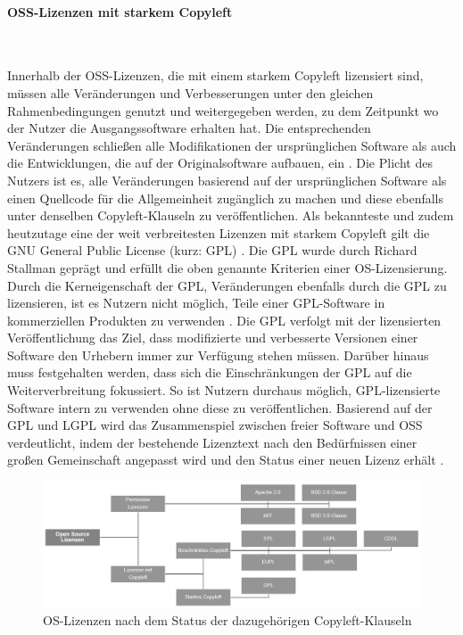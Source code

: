 \paragraph{OSS-Lizenzen mit starkem Copyleft}$~$

Innerhalb der OSS-Lizenzen, die mit einem starkem Copyleft lizensiert sind, müssen alle Veränderungen und Verbesserungen unter den gleichen Rahmenbedingungen genutzt und weitergegeben werden, zu dem Zeitpunkt wo der Nutzer die Ausgangssoftware erhalten hat. Die entsprechenden Veränderungen schließen alle Modifikationen der ursprünglichen Software als auch die Entwicklungen, die auf der Originalsoftware aufbauen, ein \cite[S. 20]{renner_open_2006}. Die Plicht des Nutzers ist es, alle Veränderungen basierend auf der ursprünglichen Software als einen Quellcode für die Allgemeinheit zugänglich zu machen und diese ebenfalls unter denselben Copyleft-Klauseln zu veröffentlichen. Als bekannteste und zudem heutzutage eine der weit verbreitesten Lizenzen mit starkem Copyleft gilt die GNU General Public License (kurz: GPL) \cite{fsf_gnu_2021}. Die GPL wurde durch Richard Stallman geprägt und erfüllt die oben genannte Kriterien einer OS-Lizensierung. Durch die Kerneigenschaft der GPL, Veränderungen ebenfalls durch die GPL zu lizensieren, ist es Nutzern nicht möglich, Teile einer GPL-Software in kommerziellen Produkten zu verwenden \cite[S. 10/11]{bitkom_open_nodate}. Die GPL verfolgt mit der lizensierten Veröffentlichung das Ziel, dass modifizierte und verbesserte Versionen einer Software den Urhebern immer zur Verfügung stehen müssen. Darüber hinaus muss festgehalten werden, dass sich die Einschränkungen der GPL auf die Weiterverbreitung fokussiert. So ist Nutzern durchaus möglich, GPL-lizensierte Software intern zu verwenden ohne diese zu veröffentlichen. Basierend auf der GPL und LGPL wird das Zusammenspiel zwischen freier Software und OSS verdeutlicht, indem der bestehende Lizenztext nach den Bedürfnissen einer großen Gemeinschaft angepasst wird und den Status einer neuen Lizenz erhält \cite[S. 35/36]{schaaf_open-source-lizenzen_2013}.

\begin{figure}[h]
    \centering
    \includegraphics[scale=0.55]{Bilder/Lizenzenvarianten.png}
    \caption{OS-Lizenzen nach dem Status der dazugehörigen Copyleft-Klauseln}
\end{figure}

